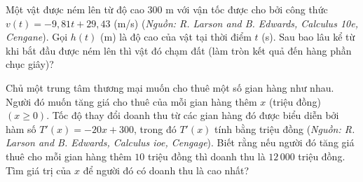 \begin{ex}%
Một vật được ném lên từ độ cao $300$ m với vận tốc được cho bởi công thức $v(t)=-9{,}81t+29{,}43$ (m/s) (\textit{Nguồn: R. Larson and B. Edwards, Calculus 10e, Cengane}). Gọi $h(t)$ (m) là độ cao của vật tại thời điểm $t$ (s). Sau bao lâu kể từ khi bắt đầu được ném lên thì vật đó chạm đất (làm tròn kết quả đến hàng phần chục giây)?
\end{ex}

\begin{ex}%
Chủ một trung tâm thương mại muốn cho thuê một số gian hàng như nhau. Người đó muốn tăng giá cho thuê của mỗi gian hàng thêm $x$ (triệu đồng) $(x\ge 0)$. Tốc độ thay đổi doanh thu từ các gian hàng đó được biểu diễn bởi hàm số $T'(x)=-20x+300$, trong đó $T'(x)$ tính bằng triệu đồng (\textit{Nguồn: R. Larson and B. Edwards, Calculus ioe, Cengage}). Biết rằng nếu người đó tăng giá thuê cho mỗi gian hàng thêm $10$ triệu đồng thì doanh thu là $12\,000$ triệu đồng. Tìm giá trị của $x$ để người đó có doanh thu là cao nhất?
\end{ex}

